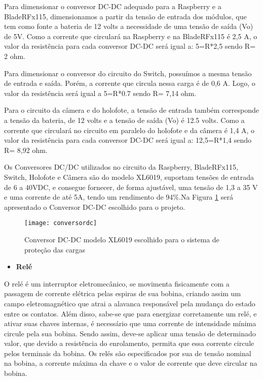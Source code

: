 Para dimensionar o conversor DC-DC adequado para a Raspberry e a BladeRFx115, dimensionamos a partir da tensão de entrada dos módulos, que tem como fonte a bateria de 12 volts a necessidade de uma tensão de saída (Vo) de 5V. Como a corrente que circulará na Raspberry e na BladeRFx115  é 2,5 A, o valor da resistência para cada conversor DC-DC será igual a: 5=R*2,5 sendo R= 2 ohm.

Para dimensionar o conversor do circuito do Switch, possuímos a mesma tensão de entrada e saída. Porém, a corrente que circula nessa carga é de 0,6 A. Logo, o valor da resistência será igual a 5=R*0.7 sendo R= 7,14 ohm.

Para o circuito da câmera e do holofote, a tensão de entrada também corresponde a tensão da bateria, de 12 volts e a tensão de saída (Vo) é 12.5 volts. Como a corrente que circulará no circuito em paralelo do holofote e da câmera é 1,4 A, o valor da resistência para cada conversor DC-DC será igual a: 12,5=R*1,4 sendo R= 8,92 ohm.

Os Conversores DC/DC utilizados no circuito da Raspberry, BladeRFx115, Switch, Holofote e Câmera são do modelo XL6019, suportam tensões de entrada de 6 a 40VDC, e consegue fornecer, de forma ajustável, uma tensão de 1,3 a 35 V e uma corrente de até 5A, tendo um rendimento de 94\%.Na Figura \ref{fig:conversordc} será apresentado o Conversor DC-DC escolhido para o projeto.

\begin{figure}[H]
\centering
\texttt{[image: conversordc]}
    \caption{Conversor DC-DC modelo XL6019 escolhido para o sistema de proteção das cargas}
\label{fig:conversordc}
\end{figure}
\FloatBarrier


\begin{itemize}

    \item \textbf{Relé}
    
\end{itemize}

O relé é um interruptor eletromecânico, se movimenta fisicamente com a passagem de corrente elétrica pelas espiras de sua bobina, criando assim um campo eletromagnético que atrai a alavanca responsável pela mudança do estado entre os contatos. Além disso, sabe-se que para energizar corretamente um relé, e ativar suas chaves internas, é necessário que uma corrente de intensidade mínima circule pela sua bobina. Sendo assim, deve-se aplicar uma tensão de determinado valor, que devido a resistência do enrolamento, permita que essa corrente circule pelos terminais da bobina. Os relés são especificados por sua de tensão nominal na bobina, a corrente máxima da chave e o valor de corrente que deve circular na bobina.


